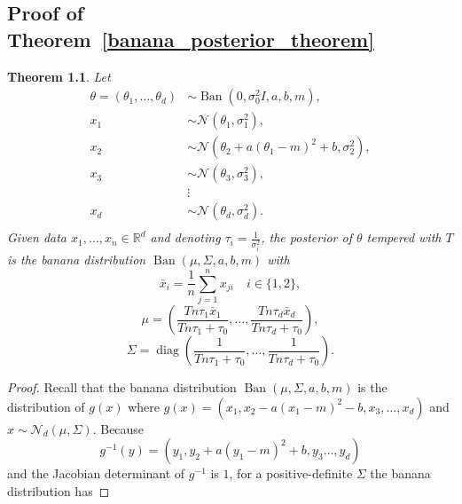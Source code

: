 \documentclass[english,twoside,openright]{HYgraduMLDS}
\newtheorem{theorem}[lemma]{Theorem}
\newcommand{\R}{\mathbb{R}}
\newcommand{\caln}{{\mathcal{N}}}
\DeclareMathOperator{\ban}{Ban}
\DeclareMathOperator{\diag}{diag}
\begin{document}
\begin{appendices}
\myappendixtitle

\chapter{Proof of Theorem~\ref{banana_posterior_theorem}}\label{banana_posterior_theorem_proof}

\setcounter{temp_counter}{\value{lemma}}
\setcounter{temp_counter_chap}{\value{chapter}}
\renewcommand{\thelemma}{5.2}
\begin{theorem}
    Let
    \begin{align*}
        \theta = (\theta_1,\dotsc, \theta_d) &\sim
        \ban(0, \sigma_0^2I, a, b, m), \\
        x_1 &\sim \caln(\theta_1, \sigma_1^2), \\
        x_2 &\sim \caln(\theta_2 + a(\theta_1 - m)^2 + b, \sigma_2^2),\\
        x_3 &\sim \caln(\theta_3, \sigma_3^2), \\
            &\vdots \\
        x_d &\sim \caln(\theta_d, \sigma_d^2). \\
    \end{align*}
    Given data \(x_1,\dotsc, x_n\in \R^d\) and
    denoting \(\tau_i = \frac{1}{\sigma_i^2}\),
    the posterior of \(\theta\) tempered with \(T\) is the banana distribution
    \(\ban(\mu, \Sigma, a, b, m)\)
    with
    \[
        \bar{x}_i = \frac{1}{n}\sum_{j=1}^n x_{ji} \quad i\in \{1, 2\},
    \]
    \[
        \mu = \left(\frac{Tn\tau_1\bar{x}_1}{Tn\tau_1 + \tau_0},\dotsc,
        \frac{Tn\tau_d\bar{x}_d}{Tn\tau_d + \tau_0}\right),
    \]
    \[
        \Sigma = \diag\left(
            \frac{1}{Tn\tau_1 + \tau_0},\dotsc,
            \frac{1}{Tn\tau_d + \tau_0}
        \right).
    \]
\end{theorem}
\begin{proof}
  Recall that the banana distribution \(\ban(\mu, \Sigma, a, b, m)\) is the distribution of
  \(g(x)\) where \(g(x) = (x_{1}, x_{2} - a(x_{1} - m)^{2} - b, x_{3},\dotsc,x_{d})\)
  and \(x\sim \caln_{d}(\mu, \Sigma)\).
  Because
  \[
    g^{-1}(y) = (y_1, y_2 + a(y_1 - m)^2 + b, y_3\dotsc, y_d)
  \]
  and the Jacobian determinant of \(g^{-1}\) is \(1\),
  for a positive-definite \(\Sigma\) the banana distribution has

\end{proof}
\end{appendices}
\end{document}
